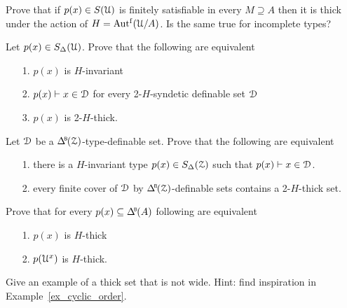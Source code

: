 \begin{exercise}
  Prove that if $p(x)\in S(\EuScript U)$ is finitely satisfiable in every $M\supseteq A$ then it is thick under the action of $H=\mbox{Aut$^{\rm f}$}(\EuScript U/A)$.
  Is the same true for incomplete types?
\end{exercise}

\begin{exercise}
  Let $p(x)\in S_\Delta(\EuScript U)$.
  Prove that the following are equivalent
  \begin{itemize}
    \item[1.] $p(x)$ is $H$-invariant
    \item[2.] $p(x)\vdash x\in\EuScript D$ for every 2-$H$-syndetic definable set $\EuScript D$
    \item[3.] $p(x)$ is 2-$H$-thick.
  \end{itemize}
\end{exercise}

\begin{exercise}
  Let $\EuScript D$ be a $\BDelta(\Z)$-type-definable set.
  Prove that the following are equivalent 
  \begin{itemize}
    \item[1.] there is a $H$-invariant type $p(x)\in S_\Delta(\EuScript Z)$ such that $p(x)\vdash x\in\EuScript D$.
    \item[2.] every finite cover of $\EuScript D$ by $\BDelta(\Z)$-definable sets contains a 2-$H$-thick set.
  \end{itemize}
\end{exercise}


\begin{exercise}\label{ex_thick_types}
  Prove that for every $p(x)\subseteq \BDelta(A)$ following are equivalent
  \begin{itemize}
    \item[1.] $p(x)$ is $H$-thick
    \item[2.] $p(\EuScript U^x)$ is $H$-thick.
  \end{itemize}
\end{exercise}

\begin{exercise}
  Give an example of a thick set that is not wide.
  Hint: find inspiration in Example~\ref{ex_cyclic_order}.
\end{exercise}

